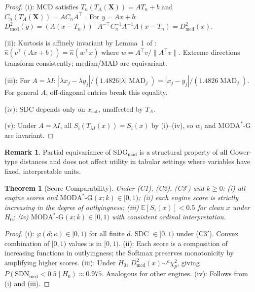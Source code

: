\documentclass[11pt]{article}
\theoremstyle{plain}
\newtheorem{theorem}{Theorem}
\theoremstyle{definition}
\newtheorem{remark}{Remark}
\DeclareMathOperator{\MAD}{MAD}
\newcommand{\E}{\mathbb{E}}
\newcommand{\moda}{\text{MODA}^*\text{-G}}
\begin{document}
\begin{proof}
(i): MCD satisfies
$T_n(T_A(\mathbf{X})) = AT_n + b$ and
$C_n(T_A(\mathbf{X})) = AC_nA^\top$
\citep{rousseeuw1985}.
For $y = Ax + b$:
$D_\text{mcd}^2(y) = (A(x-T_n))^\top
A^{-\top}C_n^{-1}A^{-1}A(x-T_n) = D_\text{mcd}^2(x)$.

(ii): Kurtosis is affinely invariant by Lemma~1 of
\citet{pena2001}: $\hat{\kappa}(v^\top(Ax+b)) =
\hat{\kappa}(w^\top x)$ where $w = A^\top v/\|A^\top v\|$.
Extreme directions transform consistently; median/MAD
are equivariant.

(iii): For $A = \lambda I$:
$|{\lambda x_j - \lambda y_j}|/(1.4826|\lambda|\MAD_j) =
|x_j - y_j|/(1.4826\MAD_j)$. For general $A$,
off-diagonal entries break this equality.

(iv): SDC depends only on $x_\text{cat}$, unaffected
by $T_A$.

(v): Under $A = \lambda I$, all $S_i(T_{\lambda I}(x)) =
S_i(x)$ by (i)--(iv), so $w_i$ and $\moda$ are
invariant.
\end{proof}

\begin{remark}
Partial equivariance of SDG$_\text{mad}$ is a structural
property of all Gower-type distances and does not affect
utility in tabular settings where variables have fixed,
interpretable units.
\end{remark}

\begin{theorem}[Score Comparability]
\label{thm:calibration}
Under (C1), (C2), (C3$'$) and $k \geq 0$:
(i) all engine scores and $\moda(x;k) \in [0,1)$;
(ii) each engine score is strictly increasing in the
degree of outlyingness;
(iii) $\E[S_i(x)] < 0.5$ for clean $x$ under $H_0$;
(iv) $\moda(x;k) \in [0,1)$ with consistent ordinal
interpretation.
\end{theorem}

\begin{proof}
(i): $\varphi(d;\kappa) \in [0,1)$ for all finite $d$.
SDC $\in [0,1)$ under (C3$'$). Convex combination
of $[0,1)$ values is in $[0,1)$.
(ii): Each score is a composition of increasing functions
in outlyingness; the Softmax preserves monotonicity by
amplifying higher scores.
(iii): Under $H_0$, $D_\text{mcd}^2(x) \sim^a \chi^2_p$,
giving $P(\text{SDN}_\text{mcd} < 0.5 \mid H_0) \approx
0.975$. Analogous for other engines.
(iv): Follows from (i) and (iii).
\end{proof}
\end{document}
